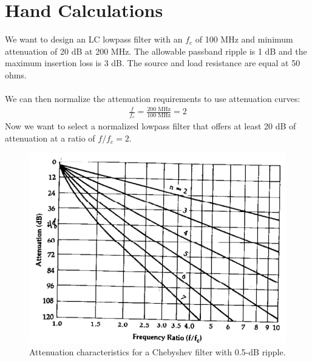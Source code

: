 \documentclass[letterpaper,12pt]{article}
\begin{document}
\section{Hand Calculations}
We want to design an LC lowpass filter with an $f_c$ of 100 MHz and minimum attenuation of 20 dB at 200 MHz. The allowable passband ripple is 1 dB and the maximum insertion loss is 3 dB. The source and load resistance are equal at 50 ohms. \\
\\
We can then normalize the attenuation requirements to use attenuation curves:
\begin{align*}
    \frac{f}{f_c} = \frac{200 \text{ MHz}}{100 \text{ MHz}} = 2
\end{align*}
Now we want to select a normalized lowpass filter that offers at least 20 dB of attenuation at a ratio of $f/f_c = 2$.
\begin{figure}[ht] 
    \centering \includegraphics[width=0.5\columnwidth]{figures/2.attenuation_characteristics}
    \caption{
            \label{fig:2.attenuation_characteristics}
            Attenuation characteristics for a Chebyshev filter with 0.5-dB ripple.
    }
\end{figure}
\end{document}

